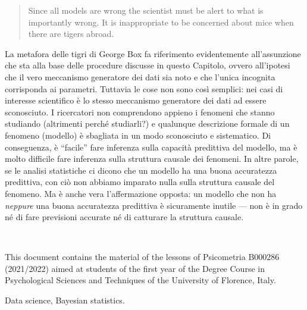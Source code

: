 \documentclass[
  10pt,
  italian,
  a4paper,
  extrafontsizes,onecolumn,openright
  ]{memoir}
\makeatletter
\newcommand{\MemoirChapStyle}{daleif1}
\newcommand{\MemoirPageStyle}{Ruled}
\newlength\widthw %
\newcommand*{\SmallMargins}{
  \setlrmarginsandblock{1.5in}{1.5in}{*}
  \setmarginnotes{0.1in}{0.1in}{0.1in}
 \setulmarginsandblock{1.5in}{1in}{*}
  \checkandfixthelayout
  \ch@ngetext
  \clearpage
  \setlength{\widthw}{\textwidth+\marginparsep+\marginparwidth}
  \footnotesatfoot
  \chapterstyle{\MemoirChapStyle}  %
  \pagestyle{\MemoirPageStyle}
}
\newcommand{\LargeMargins}{\SmallMargins}
\newcommand{\evenpage}{
  \clearpage
  \strictpagecheck %
  \checkoddpage
  \ifoddpage
    \thispagestyle{empty}
    ~\\ %
    \newpage
  \else
  \fi
}
\theoremstyle{definition}
\theoremstyle{definition}
\theoremstyle{definition}
\theoremstyle{definition}
\theoremstyle{remark}
\makeatother
\begin{document}
\begin{quote}
Since all models are wrong the scientist must be alert to what is importantly wrong. It is inappropriate to be concerned about mice when there are tigers abroad.
\end{quote}

La metafora delle tigri di George Box fa riferimento evidentemente all'assunzione che sta alla base delle procedure discusse in questo Capitolo, ovvero all'ipotesi che il vero meccanismo generatore dei dati sia noto e che l'unica incognita corrisponda ai parametri. Tuttavia le cose non sono così semplici: nei casi di interesse scientifico è lo stesso meccanismo generatore dei dati ad essere sconosciuto. I ricercatori non comprendono appieno i fenomeni che stanno studiando (altrimenti perché studiarli?) e qualunque descrizione formale di un fenomeno (modello) è sbagliata in un modo sconosciuto e sistematico. Di conseguenza, è ``facile'' fare inferenza sulla capacità predittiva del modello, ma è molto difficile fare inferenza sulla struttura causale dei fenomeni. In altre parole, se le analisi statistiche ci dicono che un modello ha una buona accuratezza predittiva, con ciò non abbiamo imparato nulla sulla struttura causale del fenomeno. Ma è anche vera l'affermazione opposta: un modello che non ha \emph{neppure} una buona accuratezza predittiva è sicuramente inutile --- non è in grado né di fare previsioni accurate né di catturare la struttura causale.



\backmatter
\SmallMargins

\printbibliography
\onecolumn




\cleardoublepage
\LargeMargins
\listoffigures







\evenpage
\SmallMargins
\thispagestyle{empty}

\begin{normalsize}

\begin{description}

\item[Abstract]
This document contains the material of the lessons of Psicometria B000286 (2021/2022) aimed at students of the first year of the Degree Course in Psychological Sciences and Techniques of the University of Florence, Italy.
\item[Keywords]
Data science, Bayesian statistics.
~\\

\end{description}

\end{normalsize}
\end{document}
